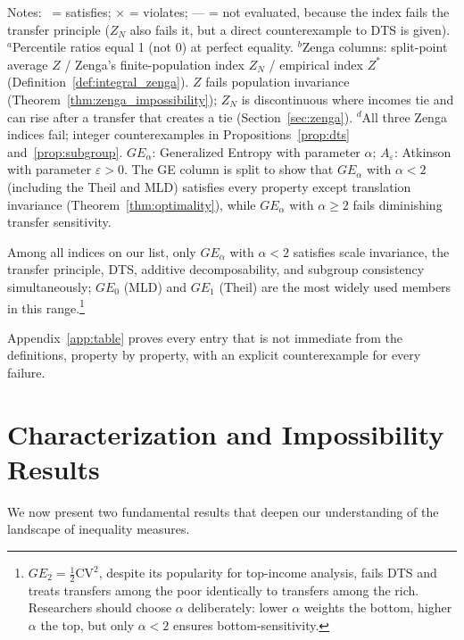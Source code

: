 \documentclass[12pt]{article}
\theoremstyle{plain}
\theoremstyle{definition}
\theoremstyle{remark}
\begin{document}
\begin{table}[H]
\vspace{0.5em}
\scriptsize
Notes: \checkmark\, = satisfies; $\times$ = violates; --- = not evaluated, because the index fails the transfer principle ($Z_N$ also fails it, but a direct counterexample to DTS is given).
$^{a}$Percentile ratios equal 1 (not 0) at perfect equality.
$^{b}$Zenga columns: split-point average $Z$ / Zenga's finite-population index $Z_N$ / empirical index $Z^*$ (Definition~\ref{def:integral_zenga}). $Z$ fails population invariance (Theorem~\ref{thm:zenga_impossibility}); $Z_N$ is discontinuous where incomes tie and can rise after a transfer that creates a tie (Section~\ref{sec:zenga}).
$^{d}$All three Zenga indices fail; integer counterexamples in Propositions~\ref{prop:dts} and~\ref{prop:subgroup}.
$GE_\alpha$: Generalized Entropy with parameter $\alpha$; $A_\varepsilon$: Atkinson with parameter $\varepsilon > 0$.
The GE column is split to show that $GE_\alpha$ with $\alpha < 2$ (including the Theil and MLD) satisfies every property except translation invariance (Theorem~\ref{thm:optimality}), while $GE_\alpha$ with $\alpha \geq 2$ fails diminishing transfer sensitivity.
\end{table}

Among all indices on our list, only $GE_\alpha$ with $\alpha < 2$ satisfies scale invariance, the transfer principle, DTS, additive decomposability, and subgroup consistency simultaneously; $GE_0$ (MLD) and $GE_1$ (Theil) are the most widely used members in this range.\footnote{$GE_2 = \frac{1}{2}\text{CV}^2$, despite its popularity for top-income analysis, fails DTS and treats transfers among the poor identically to transfers among the rich. Researchers should choose $\alpha$ deliberately: lower $\alpha$ weights the bottom, higher $\alpha$ the top, but only $\alpha < 2$ ensures bottom-sensitivity.}

Appendix~\ref{app:table} proves every entry that is not immediate from the definitions, property by property, with an explicit counterexample for every failure.

\section{Characterization and Impossibility Results}\label{sec:characterization}

We now present two fundamental results that deepen our understanding of the landscape of inequality measures.
\end{document}
